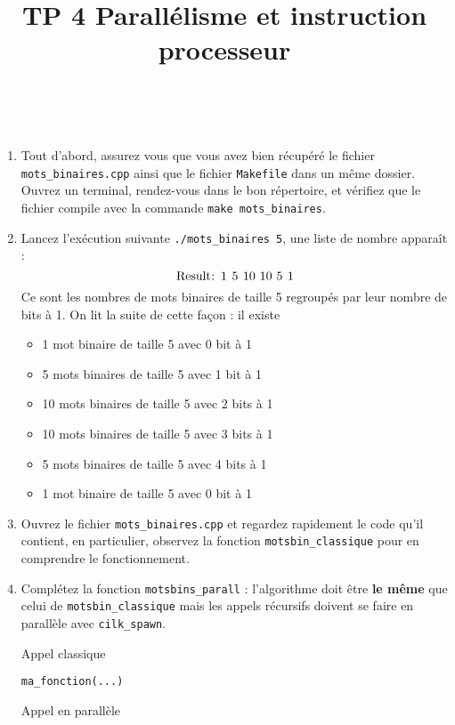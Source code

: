 \documentclass{cours}
\title{TP 4 Parallélisme et instruction processeur}
\newcommand{\lsti}[1]{\lstinline{#1}{}}
\begin{document}
\maketitle

\begin{exercice}\
\label{exo:binary}

\begin{enumerate}
\item Tout d'abord, assurez vous que vous avez bien récupéré le fichier \lsti{mots_binaires.cpp} ainsi que le fichier \lsti{Makefile} dans un même dossier. Ouvrez un terminal, rendez-vous dans le bon répertoire, et vérifiez que le fichier compile avec la commande \lsti{make mots_binaires}.

\item Lancez l'exécution suivante \lsti{./mots_binaires 5}, une liste de nombre apparaît : \[\lsti{Result: 1 5 10 10 5 1}\] Ce sont les nombres de mots binaires de taille 5 regroupés par leur nombre de bits à 1. On lit la suite de cette façon : il existe
\begin{itemize}
\item 1 mot binaire de taille 5 avec 0 bit à 1
\item 5 mots binaires de taille 5 avec 1 bit à 1
\item 10 mots binaires de taille 5 avec 2 bits à 1
\item 10 mots binaires de taille 5 avec 3 bits à 1
\item 5 mots binaires de taille 5 avec 4 bits à 1
\item 1 mot binaire de taille 5 avec 0 bit à 1
\end{itemize}

\item Ouvrez le fichier \lsti{mots_binaires.cpp} et regardez rapidement le code qu'il contient, en particulier, observez la fonction \lsti{motsbin_classique} pour en comprendre le fonctionnement.

\item Complétez la fonction \lsti{motsbins_parall} : l'algorithme doit être
  \textbf{le même} que celui de \lsti{motsbin_classique} mais les appels récursifs doivent se faire en parallèle avec \lsti{cilk_spawn}.

Appel classique

\begin{lstlisting}
ma_fonction(...)
\end{lstlisting}

Appel en parallèle


\end{enumerate}
\end{exercice}
\end{document}
